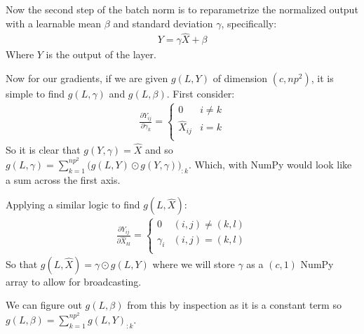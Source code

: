 \documentclass[12pt]{article}
\begin{document}
Now the second step of the batch norm is to reparametrize the normalized output
with a learnable mean $\beta$ and standard deviation $\gamma$, specifically:
\begin{align*}
    Y = \gamma \hat{X} + \beta
\end{align*}
Where $Y$ is the output of the layer.


Now for our gradients, if we are given $g(L, Y)$ of dimension $(c, np^2)$, it is simple to find
$g(L, \gamma)$ and $g(L, \beta)$. First consider:
\begin{align*}
    \frac{\partial Y_{ij}}{\partial \gamma_k} = 
    \begin{cases}
        0 & i \neq k \\
        \hat{X}_{ij} & i = k \\
    \end{cases}
\end{align*}
So it is clear that $g(Y, \gamma) = \hat{X}$ and so $g(L, \gamma) = \displaystyle \sum_{k = 1}^{np^2} \Big(g(L, Y) \odot g(Y, \gamma)\Big)_{:k}$.
Which, with NumPy would look like a sum across the first axis.


Applying a similar logic to find $g(L, \hat{X})$:
\begin{align*}
    \frac{\partial Y_{ij}}{\partial \hat{X}_{kl}} = 
    \begin{cases}
        0 & (i,j) \neq (k, l) \\
        \gamma_i & (i, j) = (k, l)\\
    \end{cases}
\end{align*}
So that $g(L, \hat{X}) = \gamma \odot g(L, Y)$ where we will store $\gamma$
as a $(c, 1)$ NumPy array to allow for broadcasting.


We can figure out $g(L, \beta)$ from this by inspection as it is a constant term so
$g(L, \beta) = \displaystyle \sum_{k = 1}^{np^2}g(L, Y)_{:k}$.
\end{document}
